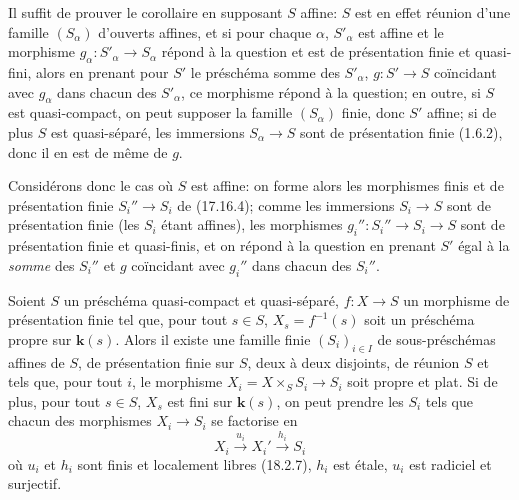 Il suffit de prouver le corollaire en supposant $S$ affine: $S$ est en effet réunion d'une famille $(S_\alpha)$ d'ouverts affines, et si pour chaque $\alpha$, $S'_\alpha$ est affine et le morphisme $g_\alpha:S'_\alpha\to S_\alpha$ répond à la question et est de présentation finie et quasi-fini, alors en prenant pour $S'$ le préschéma somme des $S'_\alpha$, $g:S'\to S$ coïncidant avec $g_\alpha$ dans chacun des $S'_\alpha$, ce morphisme répond à la question; en outre, si $S$ est quasi-compact, on peut supposer la famille $(S_\alpha)$ finie, donc $S'$ affine; si de plus $S$ est quasi-séparé, les immersions $S_\alpha\to S$ sont de présentation finie (1.6.2), donc il en est de même de $g$.

Considérons donc le cas où $S$ est affine: on forme alors les morphismes finis et de présentation finie $S_i''\to S_i$ de (17.16.4); comme les immersions $S_i\to S$ sont de présentation finie (les $S_i$ étant affines), les morphismes $g_i'':S_i''\to S_i\to S$ sont de présentation finie et quasi-finis, et on répond à la question en prenant $S'$ égal à la \emph{somme} des $S_i''$ et $g$ coïncidant avec $g_i''$ dans chacun des $S_i''$.

\begin{proposition}[17.16.6]
\label{IV.17.16.6}
Soient $S$ un préschéma quasi-compact et quasi-séparé, $f:X\to S$ un morphisme de présentation finie tel que, pour tout $s\in S$, $X_s=f^{-1}(s)$ soit un préschéma propre sur $\boldsymbol{k}(s)$. Alors il existe une famille finie $(S_i)_{i\in I}$ de sous-préschémas affines de $S$, de présentation finie sur $S$, deux à deux disjoints, de réunion $S$ et tels que, pour tout $i$, le morphisme $X_i=X\times_S S_i\to S_i$ soit \textup{propre} et \textup{plat}. Si de plus, pour tout $s\in S$, $X_s$ est fini sur $\boldsymbol{k}(s)$, on peut prendre les $S_i$ tels que chacun des morphismes $X_i\to S_i$ se factorise en
\[
  X_i\xrightarrow{u_i}X_i'\xrightarrow{h_i}S_i
\]
où $u_i$ et $h_i$ sont finis et localement libres \textup{(18.2.7)}, $h_i$ est étale, $u_i$ est radiciel et surjectif.
\end{proposition}

